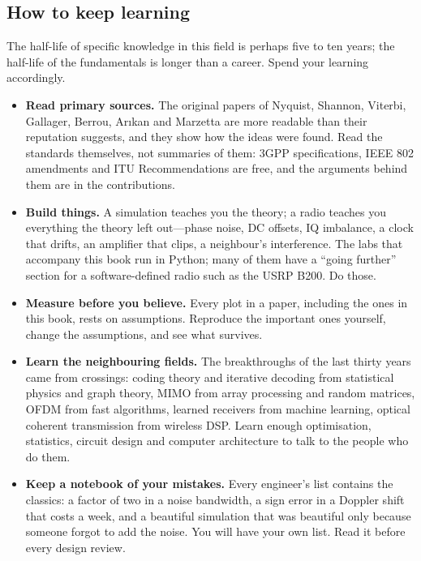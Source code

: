\subsection{How to keep learning}

The half-life of specific knowledge in this field is perhaps five to ten years; the half-life of the
fundamentals is longer than a career. Spend your learning accordingly.

\begin{itemize}
\item \textbf{Read primary sources.} The original papers of Nyquist, Shannon, Viterbi, Gallager,
Berrou, Ar\i kan and Marzetta are more readable than their reputation suggests, and they show how
the ideas were found. Read the standards themselves, not summaries of them: 3GPP specifications, IEEE
802 amendments and ITU Recommendations are free, and the arguments behind them are in the
contributions.
\item \textbf{Build things.} A simulation teaches you the theory; a radio teaches you everything the
theory left out---phase noise, DC offsets, IQ imbalance, a clock that drifts, an amplifier that
clips, a neighbour's interference. The labs that accompany this book run in Python; many of them
have a ``going further'' section for a software-defined radio such as the USRP B200. Do those.
\item \textbf{Measure before you believe.} Every plot in a paper, including the ones in this book,
rests on assumptions. Reproduce the important ones yourself, change the assumptions, and see what
survives.
\item \textbf{Learn the neighbouring fields.} The breakthroughs of the last thirty years came from
crossings: coding theory and iterative decoding from statistical physics and graph theory, MIMO from
array processing and random matrices, OFDM from fast algorithms, learned receivers from machine
learning, optical coherent transmission from wireless DSP. Learn enough optimisation, statistics,
circuit design and computer architecture to talk to the people who do them.
\item \textbf{Keep a notebook of your mistakes.} Every engineer's list contains the classics: a factor
of two in a noise bandwidth, a sign error in a Doppler shift that costs a week, and a beautiful
simulation that was beautiful only because someone forgot to add the noise. You will have your own
list. Read it before every design review.
\end{itemize}

